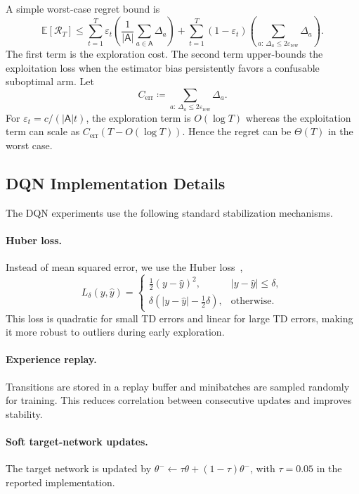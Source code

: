 \documentclass{article}
\numberwithin{equation}{section}
\theoremstyle{definition}
\begin{document}
A simple worst-case regret bound is
\begin{equation*}
\mathbb{E}[\mathcal{R}_T]
\le
\sum_{t=1}^T\varepsilon_t\left(\frac{1}{|\mathsf{A}|}\sum_{a\in\mathsf{A}}\Delta_a\right)
+
\sum_{t=1}^T(1-\varepsilon_t)
\left(\sum_{a:\,\Delta_a\le 2\varepsilon_{\mathrm{rew}}}\Delta_a\right).
\end{equation*}
The first term is the exploration cost. The second term upper-bounds the exploitation loss when the estimator bias persistently favors a confusable suboptimal arm. Let
\[
C_{\mathrm{err}}\coloneqq\sum_{a:\,\Delta_a\le2\varepsilon_{\mathrm{rew}}}\Delta_a.
\]
For $\varepsilon_t=c/(|\mathsf{A}|t)$, the exploration term is $O(\log T)$ whereas the exploitation term can scale as $C_{\mathrm{err}}(T-O(\log T))$. Hence the regret can be $\Theta(T)$ in the worst case.

\subsection{DQN Implementation Details}\label{app:dqn}
The DQN experiments use the following standard stabilization mechanisms.

\paragraph{Huber loss.}
Instead of mean squared error, we use the Huber loss~\cite{huber1992robust},
\begin{equation*}
L_\delta(y,\widehat y)=
\begin{cases}
\frac12(y-\widehat y)^2, & |y-\widehat y|\le\delta,\\[4pt]
\delta\left(|y-\widehat y|-\frac12\delta\right), & \text{otherwise.}
\end{cases}
\end{equation*}
This loss is quadratic for small TD errors and linear for large TD errors, making it more robust to outliers during early exploration.

\paragraph{Experience replay.}
Transitions are stored in a replay buffer and minibatches are sampled randomly for training. This reduces correlation between consecutive updates and improves stability.

\paragraph{Soft target-network updates.}
The target network is updated by $\theta^-\leftarrow\tau\theta+(1-\tau)\theta^-$, with $\tau=0.05$ in the reported implementation.
\end{document}
